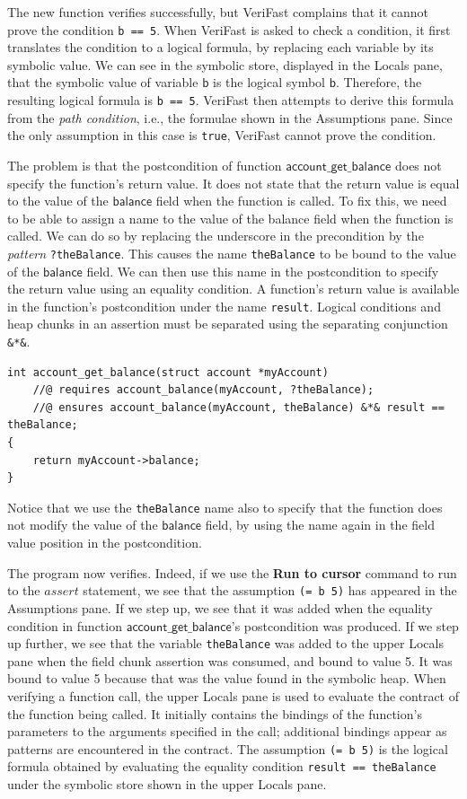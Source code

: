 \documentclass{article}
\begin{document}
The new function verifies successfully, but VeriFast complains
that it cannot prove the condition \lstinline!b == 5!. When
VeriFast is asked to check a condition, it first translates the
condition to a logical formula, by replacing each variable by
its symbolic value. We can see in the symbolic store, displayed
in the Locals pane, that the symbolic value of variable
$\mathsf{b}$ is the logical symbol $\mathsf{b}$. Therefore, the
resulting logical formula is \lstinline!b == 5!. VeriFast then
attempts to derive this formula from the \emph{path condition},
i.e., the formulae shown in the Assumptions pane. Since the
only assumption in this case is \lstinline!true!, VeriFast
cannot prove the condition.

The problem is that the postcondition of function
$\mathsf{account\_get\_balance}$ does not specify the
function's return value. It does not state that the return
value is equal to the value of the $\mathsf{balance}$ field
when the function is called. To fix this, we need to be able to
assign a name to the value of the balance field when the
function is called. We can do so by replacing the underscore in
the precondition by the \emph{pattern} \lstinline!?theBalance!.
This causes the name \lstinline!theBalance! to be bound to the
value of the $\mathsf{balance}$ field. We can then use this
name in the postcondition to specify the return value using an
equality condition. A function's return value is available in
the function's postcondition under the name \lstinline!result!.
Logical conditions and heap chunks in an assertion must be
separated using the separating conjunction \lstinline!&*&!.
\begin{lstlisting}
int account_get_balance(struct account *myAccount)
    //@ requires account_balance(myAccount, ?theBalance);
    //@ ensures account_balance(myAccount, theBalance) &*& result == theBalance;
{
    return myAccount->balance;
}
\end{lstlisting}
Notice that we use the \lstinline!theBalance! name also to
specify that the function does not modify the value of the
$\mathsf{balance}$ field, by using the name again in the field
value position in the postcondition.

The program now verifies. Indeed, if we use the \textbf{Run to
cursor} command to run to the $\mathit{assert}$ statement, we
see that the assumption \lstinline!(= b 5)! has appeared in the
Assumptions pane. If we step up, we see that it was added when
the equality condition in function
$\mathsf{account\_get\_balance}$'s postcondition was produced.
If we step up further, we see that the variable
\lstinline!theBalance! was added to the upper Locals pane when
the field chunk assertion was consumed, and bound to value 5.
It was bound to value 5 because that was the value found in the
symbolic heap. When verifying a function call, the upper Locals
pane is used to evaluate the contract of the function being
called. It initially contains the bindings of the function's
parameters to the arguments specified in the call; additional
bindings appear as patterns are encountered in the contract.
The assumption \lstinline!(= b 5)! is the logical formula
obtained by evaluating the equality condition %
\lstinline!result == theBalance! under the symbolic store shown
in the upper Locals pane.
\end{document}
